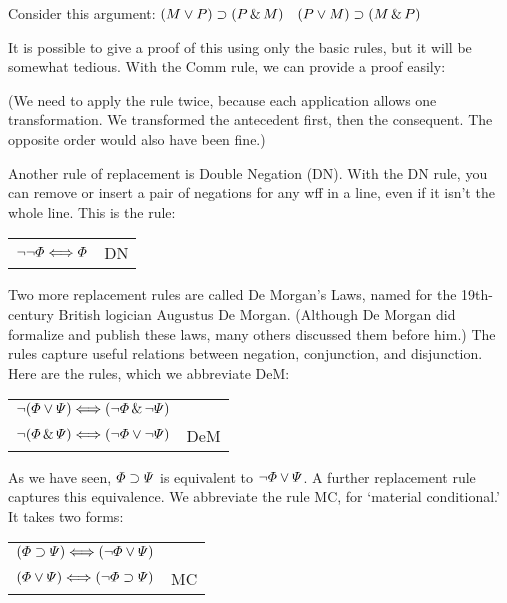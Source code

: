 Consider this argument: $(M \vee P) \supset (P \,\&\, M)$ \therefore\ $(P \vee M) \supset (M \,\&\, P)$

It is possible to give a proof of this using only the basic rules, but it will be somewhat tedious. With the Comm rule, we can provide a proof easily:

\begin{ndproof}
\end{ndproof}

(We need to apply the rule twice, because each application allows one transformation. We transformed the antecedent first, then the consequent. The opposite order would also have been fine.)

Another rule of replacement is Double Negation (DN). With the DN rule, you can remove or insert a pair of negations for any wff in a line, even if it isn't the whole line. This is the rule:

\begin{center}
\begin{tabular}{rl}
$\neg\neg\varPhi{} \Longleftrightarrow \varPhi{}$ & DN
\end{tabular}
\end{center}

Two more replacement rules  are called De Morgan's Laws, named for the 19th-century British logician Augustus De Morgan. (Although De Morgan did formalize and publish these laws, many others discussed them before him.) The rules capture useful relations between negation, conjunction, and disjunction. Here are the rules, which we abbreviate DeM:

\begin{center}
\begin{tabular}{rl}
$\neg(\varPhi{}\vee\varPsi{}) \Longleftrightarrow (\neg\varPhi{}\,\&\,\neg\varPsi{})$\\
$\neg(\varPhi{}\,\&\,\varPsi{}) \Longleftrightarrow (\neg\varPhi{}\vee\neg\varPsi{})$
& DeM
\end{tabular}
\end{center}

As we have seen, $\varPhi{}\supset\varPsi{}$ is equivalent to $\neg\varPhi{}\vee\varPsi{}$. A further replacement rule captures this equivalence. We abbreviate the rule MC, for `material conditional.' It takes two forms:

\begin{center}
\begin{tabular}{rl}
$(\varPhi{}\supset\varPsi{}) \Longleftrightarrow (\neg\varPhi{}\vee\varPsi{})$ &\\
$(\varPhi{}\vee\varPsi{}) \Longleftrightarrow (\neg\varPhi{}\supset\varPsi{})$ & MC
\end{tabular}
\end{center}

